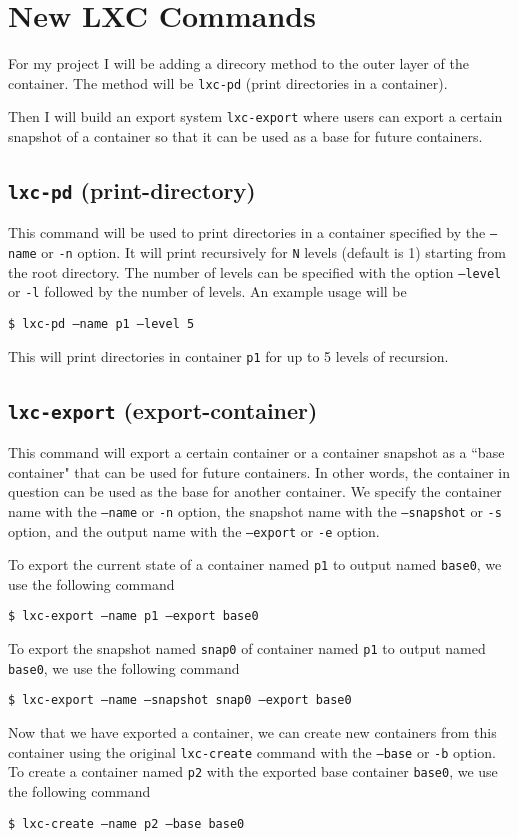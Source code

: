 \documentclass[12pt]{article}
\begin{document}
\section{New LXC Commands}

For my project I will be adding a direcory method to the outer layer of the container. The method will be \texttt{lxc-pd} (print directories in a container).

Then I will build an export system \texttt{lxc-export} where users can export a certain snapshot of a container so that it can be used as a base for future containers.

\subsection{\texttt{lxc-pd} (print-directory)}

This command will be used to print directories in a container specified by the \texttt{--name} or \texttt{-n} option. It will print recursively for \texttt{N} levels (default is 1) starting from the root directory. The number of levels can be specified with the option \texttt{--level} or \texttt{-l} followed by the number of levels. An example usage will be

\texttt{\$ lxc-pd --name p1 --level 5}

\noindent This will print directories in container \texttt{p1} for up to 5 levels of recursion.

\subsection{\texttt{lxc-export} (export-container)}

This command will export a certain container or a container snapshot as a ``base container" that can be used for future containers. In other words, the container in question can be used as the base for another container. We specify the container name with the \texttt{--name} or \texttt{-n} option, the snapshot name with the \texttt{--snapshot} or \texttt{-s} option, and the output name with the \texttt{--export} or \texttt{-e} option.

\noindent To export the current state of a container named \texttt{p1} to output named \texttt{base0}, we use the following command

\texttt{\$ lxc-export --name p1 --export base0}

\noindent To export the snapshot named \texttt{snap0} of container named \texttt{p1} to output named \texttt{base0}, we use the following command

\texttt{\$ lxc-export --name --snapshot snap0 --export base0}

\noindent Now that we have exported a container, we can create new containers from this container using the original \texttt{lxc-create} command with the \texttt{--base} or \texttt{-b} option. To create a container named \texttt{p2} with the exported base container \texttt{base0}, we use the following command

\texttt{\$ lxc-create --name p2 --base base0}
\end{document}
